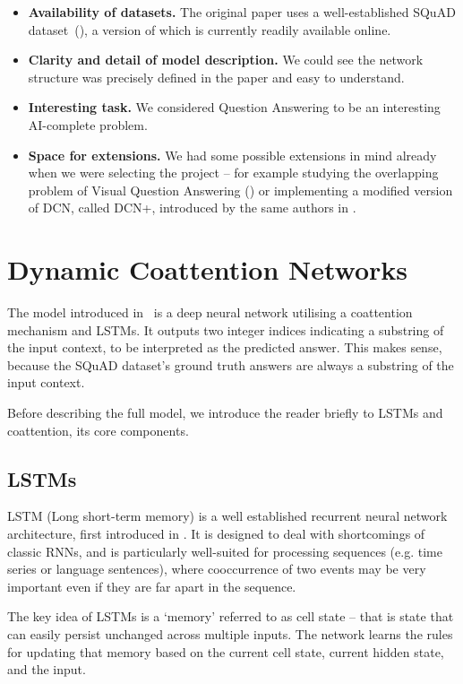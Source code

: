 \documentclass[a4paper, 10pt, conference]{article}
\begin{document}
\begin{itemize}
\item \textbf{Availability of datasets.} The original paper uses a well-established SQuAD dataset~(\cite{rajpurkar2016squad}), a version of which is currently readily available online.
\item \textbf{Clarity and detail of model description.} We could see the network structure was precisely defined in the paper and easy to understand.
\item \textbf{Interesting task.} We considered Question Answering to be an interesting AI-complete problem.
\item \textbf{Space for extensions.} We had some possible extensions in mind already when we were selecting the project -- for example studying the overlapping problem of Visual Question Answering (\cite{visual-qa}) or implementing a modified version of DCN, called DCN+, introduced by the same authors in \cite{dcn-plus}.
\end{itemize}

\section{Dynamic Coattention Networks}

The model introduced in~\cite{dcn} is a deep neural network utilising a coattention mechanism and LSTMs. It outputs two integer indices indicating a substring of the input context, to be interpreted as the predicted answer. 
This makes sense, because the SQuAD dataset's ground truth answers are always a substring of the input context.

Before describing the full model, we introduce the reader briefly to LSTMs and coattention, its core components.

\subsection{LSTMs}

LSTM (Long short-term memory) is a well established recurrent neural network architecture, first introduced in \cite{lstm}. It is designed to deal with shortcomings of classic RNNs, and is particularly well-suited for processing sequences (e.g. time series or language sentences), where cooccurrence of two events may be very important even if they are far apart in the sequence.

The key idea of LSTMs is a `memory' referred to as cell state -- that is state that can easily persist unchanged across multiple inputs. The network learns the rules for updating that memory based on the current cell state, current hidden state, and the input.
\end{document}
